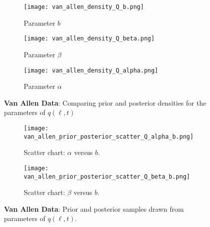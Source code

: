 \begin{figure*}[!htb]
  \centering
  \begin{subfigure}[b]{0.5\textwidth}
    \centering
    \texttt{[image: van\_allen\_density\_Q\_b.png]}
    \caption{Parameter $b$}
    \label{fig:qbvanAllen}
  \end{subfigure}
  \hfill
  \begin{subfigure}[b]{0.5\textwidth}
    \centering
    \texttt{[image: van\_allen\_density\_Q\_beta.png]}
    \caption{Parameter $\beta$}
    \label{fig:qbetavanAllen}
  \end{subfigure}
  \hfill
  \begin{subfigure}[b]{0.5\textwidth}
    \centering
    \texttt{[image: van\_allen\_density\_Q\_alpha.png]}
    \caption{Parameter $\alpha$}
    \label{fig:qalphavanAllen}
  \end{subfigure}
  \caption{
    \textbf{Van Allen Data}: Comparing prior and posterior densities 
    for the parameters of $q(\ell, t)$}  
\end{figure*}

\begin{figure*}[!htb]
  \centering
  \begin{subfigure}[b]{0.75\textwidth}
    \centering
    \texttt{[image: van\_allen\_prior\_posterior\_scatter\_Q\_alpha\_b.png]}
    \caption{ 
      Scatter chart: $\alpha$ versus $b$.  
    }
    \label{fig:alphavsbvanAllen}
  \end{subfigure}
  \hfill
  \begin{subfigure}[b]{0.75\textwidth}
    \centering
    \texttt{[image: van\_allen\_prior\_posterior\_scatter\_Q\_beta\_b.png]}
    \caption{
      Scatter chart: $\beta$ versus $b$.  
    }
    \label{fig:betavsbvanAllen}
  \end{subfigure}
  \caption{
    \textbf{Van Allen Data}: Prior and posterior samples 
    drawn from parameters of $q(\ell, t)$.
  }
\end{figure*}





%
%
